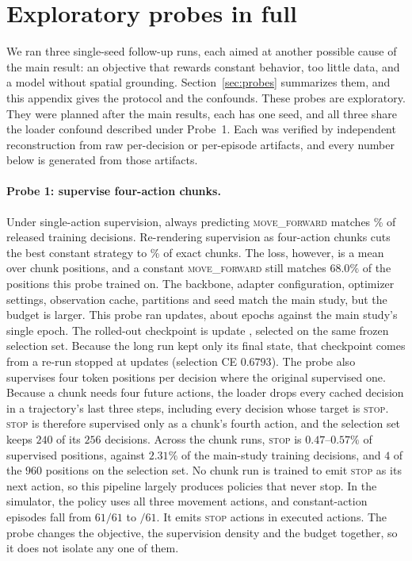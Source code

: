 \section{Exploratory probes in full}
\label{app:probes}

We ran three single-seed follow-up runs, each aimed at another possible cause of the main result:
an objective that rewards constant behavior, too little data, and a model without spatial grounding.
Section~\ref{sec:probes} summarizes them, and this appendix gives the protocol and the confounds.
These probes are exploratory. They were planned after the main results, each has one seed,
and all three share the loader confound described under Probe~1. Each was verified by independent
reconstruction from raw per-decision or per-episode artifacts, and every number below is generated
from those artifacts.

\paragraph{Probe 1: supervise four-action chunks.}
Under single-action supervision, always predicting \textsc{move\_forward} matches
\PrConstSingle\% of released training decisions. Re-rendering supervision as four-action chunks
cuts the best constant strategy to \PrConstChunk\% of exact chunks. The loss, however, is a mean
over chunk positions, and a constant \textsc{move\_forward} still matches $68.0\%$ of the positions
this probe trained on. The backbone, adapter configuration, optimizer settings, observation cache,
partitions and seed match the main study, but the budget is larger. This probe ran
\PrPilotUpdates{} updates, about \PrPilotEpochs{} epochs against the main study's single epoch. The
rolled-out checkpoint is update \PrPilotCkptU, selected on the same frozen selection set. Because the
long run kept only its final state, that checkpoint comes from a re-run stopped at \PrPilotCkptU{}
updates (selection CE $0.6793$). The probe also supervises four token positions per decision where the
original supervised one. Because a chunk needs four future actions, the loader drops every cached
decision in a trajectory's last three steps, including every decision whose target is
\textsc{stop}. \textsc{stop} is therefore supervised only as a chunk's fourth action, and the
selection set keeps $240$ of its $256$ decisions. Across the chunk runs, \textsc{stop} is
$0.47$--$0.57\%$ of supervised positions, against $2.31\%$ of the main-study training decisions, and
$4$ of the $960$ positions on the selection set. No chunk run is trained to emit \textsc{stop} as its
next action, so this pipeline largely produces policies that never stop. In the simulator, the
policy uses all three movement actions, and constant-action episodes fall from $61/61$ to
\PrPilotClConst$/61$. It emits \PrPilotClStopActs{} \textsc{stop} actions in \PrPilotClActs{}
executed actions. The probe changes the objective, the supervision density and the budget together,
so it does not isolate any one of them.

